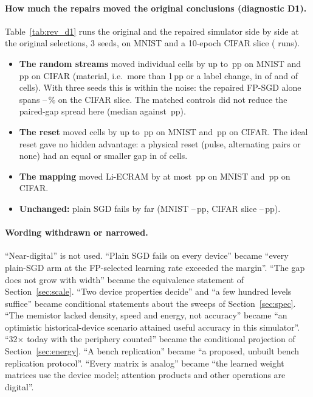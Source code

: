 \paragraph{How much the repairs moved the original conclusions (diagnostic D1).} Table~\ref{tab:rev_d1} runs the original and
the repaired simulator side by side at the original selections, 3 seeds, on MNIST and a 10-epoch CIFAR slice
(\RVdOneRuns{} runs).
\begin{itemize}
\item \textbf{The random streams} moved individual cells by up to \RVdOneRngMnistMaxAbs\,pp on MNIST and
      \RVdOneRngCifarMaxAbs\,pp on CIFAR (material, i.e.\ more than 1\,pp or a label change, in \RVdOneRngMnistNMaterial{} of
      \RVdOneRngMnistN{} and \RVdOneRngCifarNMaterial{} of \RVdOneRngCifarN{} cells). With three seeds this is within the noise:
      the repaired FP-SGD alone spans \RVdOneCifarFpMin--\RVdOneCifarFpMax\,\% on the CIFAR slice. The matched controls did not
      reduce the paired-gap spread here (median \RVdOneSdRev{} against \RVdOneSdOld\,pp).
\item \textbf{The reset} moved cells by up to \RVdOneResetMnistMaxAbs\,pp on MNIST and \RVdOneResetCifarMaxAbs\,pp on CIFAR. The
      ideal reset gave no hidden advantage: a physical reset (pulse, alternating pairs or none) had an equal or smaller gap in
      \RVdOneResetBetterN{} of \RVdOneResetN{} cells.
\item \textbf{The mapping} moved Li-ECRAM by at most \RVdOneMapMnistMaxAbs\,pp on MNIST and \RVdOneMapCifarMaxAbs\,pp on CIFAR.
\item \textbf{Unchanged:} plain SGD fails by far (MNIST \RVdOneSgdMnistMin--\RVdOneSgdMnistMax\,pp, CIFAR slice
      \RVdOneSgdCifarMin--\RVdOneSgdCifarMax\,pp).
\end{itemize}

\paragraph{Wording withdrawn or narrowed.} ``Near-digital'' is not used. ``Plain SGD fails on every device'' became ``every
plain-SGD arm at the FP-selected learning rate exceeded the margin''. ``The gap does not grow with width'' became the equivalence
statement of Section~\ref{sec:scale}. ``Two device properties decide'' and ``a few hundred levels suffice'' became conditional
statements about the sweeps of Section~\ref{sec:spec}. ``The memistor lacked density, speed and energy, not accuracy'' became
``an optimistic historical-device scenario attained useful accuracy in this simulator''. ``32$\times$ today with the periphery
counted'' became the conditional projection of Section~\ref{sec:energy}. ``A bench replication'' became ``a proposed, unbuilt
bench replication protocol''. ``Every matrix is analog'' became ``the learned weight matrices use the device model; attention
products and other operations are digital''.

